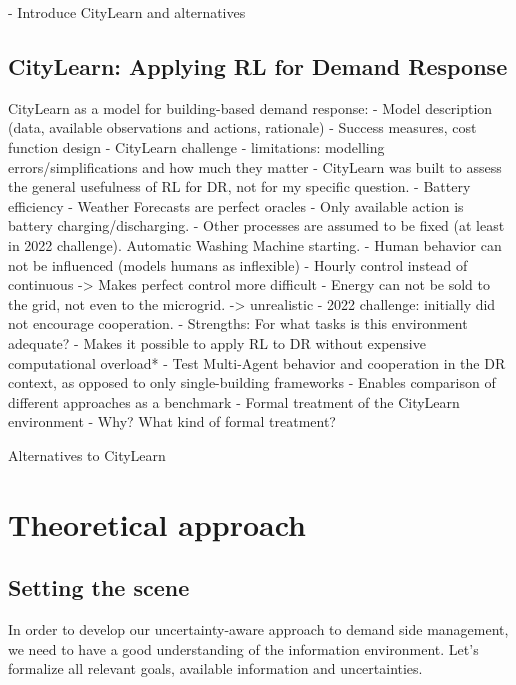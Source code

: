 - Introduce CityLearn and alternatives


\subsection{CityLearn: Applying RL for Demand Response}

CityLearn as a model for building-based demand response:
    - Model description (data, available observations and actions, rationale)
    - Success measures, cost function design
    - CityLearn challenge
    - limitations: modelling errors/simplifications and how much they matter
        - CityLearn was built to assess the general usefulness of RL for DR, not for my specific question.
        - Battery efficiency
        - Weather Forecasts are perfect oracles
        - Only available action is battery charging/discharging.
        - Other processes are assumed to be fixed (at least in 2022 challenge). Automatic Washing Machine starting.
        - Human behavior can not be influenced (models humans as inflexible)
        - Hourly control instead of continuous -> Makes perfect control more difficult
        - Energy can not be sold to the grid, not even to the microgrid. -> unrealistic
        - 2022 challenge: initially did not encourage cooperation.
    - Strengths: For what tasks is this environment adequate?
        - Makes it possible to apply RL to DR without expensive computational overload*
        - Test Multi-Agent behavior and cooperation in the DR context, as opposed to only single-building frameworks
        - Enables comparison of different approaches as a benchmark
    - Formal treatment of the CityLearn environment
        - Why? What kind of formal treatment?
    
Alternatives to CityLearn
    


\section{Theoretical approach}
\subsection{Setting the scene}
In order to develop our uncertainty-aware approach to demand side management, we need to have a good understanding of the information environment.
Let's formalize all relevant goals, available information and uncertainties.

